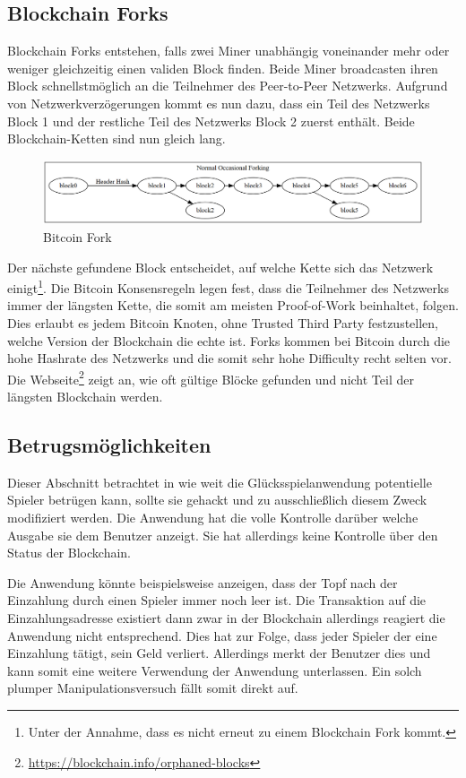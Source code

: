 \subsection{Blockchain Forks} \label{sssec:btc_fork}
Blockchain Forks entstehen, falls zwei Miner unabhängig voneinander mehr oder weniger gleichzeitig einen validen Block finden. Beide Miner broadcasten ihren Block schnellstmöglich an die Teilnehmer des Peer-to-Peer Netzwerks. Aufgrund von Netzwerkverzögerungen kommt es nun dazu, dass ein Teil des Netzwerks Block 1 und der restliche Teil des Netzwerks Block 2 zuerst enthält. Beide Blockchain-Ketten sind nun gleich lang.
\begin{figure}[H]
\centering
\includegraphics[width=1\linewidth]{Figures/btc/fork_normal}
\decoRule
\caption{Bitcoin Fork}
\label{fig:fork_normal}
\end{figure}
Der nächste gefundene Block entscheidet, auf welche Kette sich das Netzwerk einigt\footnote{Unter der Annahme, dass es nicht erneut zu einem Blockchain Fork kommt.}. Die Bitcoin Konsensregeln legen fest, dass die Teilnehmer des Netzwerks immer der längsten Kette, die somit am meisten Proof-of-Work beinhaltet, folgen. Dies erlaubt es jedem Bitcoin Knoten, ohne Trusted Third Party festzustellen, welche Version der Blockchain die echte ist. Forks kommen bei Bitcoin durch die hohe Hashrate des Netzwerks und die somit sehr hohe Difficulty recht selten vor. Die Webseite\footnote{\url{https://blockchain.info/orphaned-blocks}} zeigt an, wie oft gültige Blöcke gefunden und nicht Teil der längsten Blockchain werden.

\subsection{Betrugsmöglichkeiten}

Dieser Abschnitt betrachtet in wie weit die Glücksspielanwendung potentielle Spieler betrügen kann, sollte sie gehackt und zu ausschließlich diesem Zweck modifiziert werden.
Die Anwendung hat die volle Kontrolle darüber welche Ausgabe sie dem Benutzer anzeigt. Sie hat allerdings keine Kontrolle über den Status der Blockchain. 

Die Anwendung könnte beispielsweise anzeigen, dass der Topf nach der Einzahlung durch einen Spieler immer noch leer ist. Die Transaktion auf die Einzahlungsadresse existiert dann zwar in der Blockchain allerdings reagiert die Anwendung nicht entsprechend. Dies hat zur Folge, dass jeder Spieler der eine Einzahlung tätigt, sein Geld verliert. Allerdings merkt der Benutzer dies und kann somit eine weitere Verwendung der Anwendung unterlassen. Ein solch plumper Manipulationsversuch fällt somit direkt auf.

